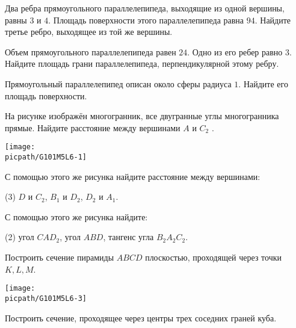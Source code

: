 \begin{class}[number=6]
	\begin{listofex}
		\item Два ребра прямоугольного параллелепипеда, выходящие из одной вершины, равны \(3\) и \(4\). Площадь поверхности этого параллелепипеда равна \(94\). Найдите третье ребро, выходящее из той же вершины.
		\item Объем прямоугольного параллелепипеда равен \(24\). Одно из его ребер равно \(3\). Найдите площадь грани параллелепипеда, перпендикулярной этому ребру.
		\item Прямоугольный параллелепипед описан около сферы радиуса \(1\). Найдите его площадь поверхности.
		\item 
		\begin{minipage}[t]{\bodywidth}
			На рисунке изображён многогранник, все двугранные углы многогранника прямые. Найдите расстояние между вершинами \(A\) и \(C_2\) .
		\end{minipage}
		\hspace{0.02\linewidth}
		\begin{minipage}[t]{\picwidth}
			\texttt{[image: \\picpath/G101M5L6-1]}
		\end{minipage}
		\item С помощью этого же рисунка найдите расстояние между вершинами:
		\begin{tasks}(3)
			\task \(D\) и \(C_2\),
			\task \(B_1\) и \(D_2\),
			\task \(D_2\) и \(A_1\).
		\end{tasks}
		\item С помощью этого же рисунка найдите:
		\begin{tasks}(2)
			\task угол \( CAD_2 \),
			\task угол \( ABD \),
			\task тангенс угла \( B_2A_2C_2 \).
		\end{tasks}
		\item 
		\begin{minipage}[t]{\bodywidth}
			Построить сечение пирамиды \(ABCD\) плоскостью, проходящей через точки \(K, L, M\).
		\end{minipage}
		\hspace{0.02\linewidth}
		\begin{minipage}[t]{\picwidth}
			\texttt{[image: \\picpath/G101M5L6-3]}
		\end{minipage}
		\item Построить сечение, проходящее через центры трех соседних граней куба.
	\end{listofex}
\end{class}

